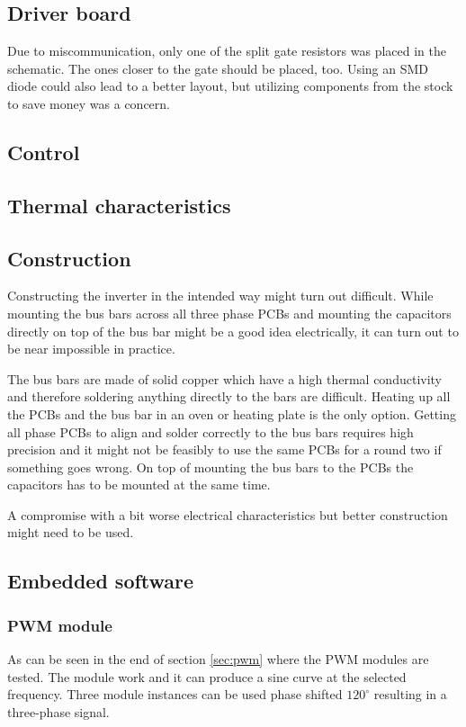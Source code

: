\subsection{Driver board}
Due to miscommunication, only one of the split gate resistors was placed in the schematic. The ones closer to the gate should be placed, too. Using an SMD diode could also lead to a better layout, but utilizing components from the stock to save money was a concern.

\subsection{Control}

\subsection{Thermal characteristics}


\subsection{Construction}
Constructing the inverter in the intended way might turn out difficult. While mounting the bus bars across all three phase PCBs and mounting the capacitors directly on top of the bus bar might be a good idea electrically, it can turn out to be near impossible in practice.

The bus bars are made of solid copper which have a high thermal conductivity and therefore soldering anything directly to the bars are difficult. Heating up all the PCBs and the bus bar in an oven or heating plate is the only option. 
Getting all phase PCBs to align and solder correctly to the bus bars requires high precision and it might not be feasibly to use the same PCBs for a round two if something goes wrong.
On top of mounting the bus bars to the PCBs the capacitors has to be mounted at the same time. 

A compromise with a bit worse electrical characteristics but better construction might need to be used.

\subsection{Embedded software}
\subsubsection{PWM module}
As can be seen in the end of section \ref{sec:pwm} where the PWM modules are tested. The module work and it can produce a sine curve at the selected frequency. Three module instances can be used phase shifted $120^\circ$ resulting in a three-phase signal.

